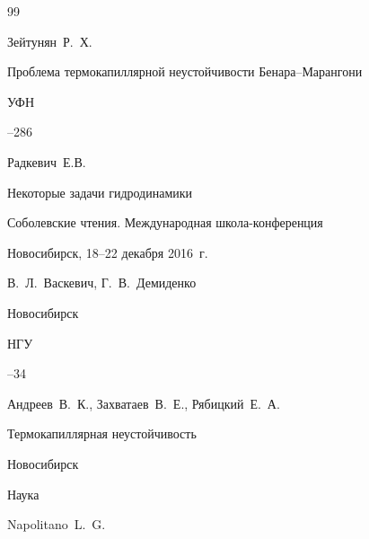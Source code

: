 \begin{thebibliography}{99}







\by Зейтунян~Р.~Х.

\paper Проблема термокапиллярной неустойчивости Бенара--Марангони

\jour УФН 



–286 





\by Радкевич~Е.В.

\paper Некоторые задачи гидродинамики

\inbook Соболевские чтения. \rm Международная школа-конференция 

\procinfo Новосибирск, 18--22 декабря 2016~г.

\eds В.~Л.~Васкевич, Г.~В.~Демиденко

\publaddr Новосибирск

\publ НГУ


--34






\by Андреев~В.~К., Захватаев~В.~Е., Рябицкий~Е.~А. 

\book Термокапиллярная неустойчивость

\publaddr Новосибирск

\publ Наука












\by Napolitano~L.~G.


\end{thebibliography}
